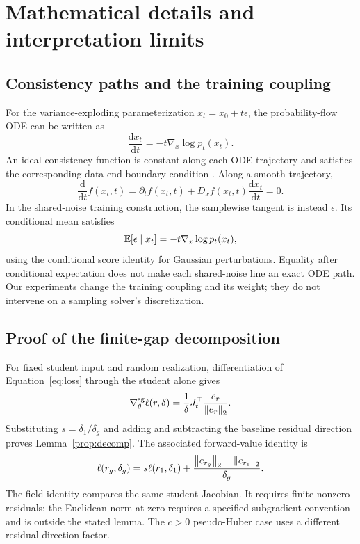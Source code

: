 \section{Mathematical details and interpretation limits}
\label{app:theory}
\subsection{Consistency paths and the training coupling}
For the variance-exploding parameterization $x_t=x_0+t\epsilon$, the probability-flow ODE can be written as
\begin{equation}
 \frac{\mathrm dx_t}{\mathrm dt}=-t\nabla_x\log p_t(x_t).
\end{equation}
An ideal consistency function is constant along each ODE trajectory and satisfies the corresponding data-end boundary condition \citep{song2021sde,song2023consistency}. Along a smooth trajectory,
\begin{equation}
 \frac{\mathrm d}{\mathrm dt}f(x_t,t)
 =\partial_t f(x_t,t)+D_x f(x_t,t)\frac{\mathrm dx_t}{\mathrm dt}=0.
\end{equation}
In the shared-noise training construction, the samplewise tangent is instead $\epsilon$. Its conditional mean satisfies
\begin{equation}
 \mathbb{E}[\epsilon\mid x_t]=-t\nabla_x\log p_t(x_t),
\end{equation}
using the conditional score identity for Gaussian perturbations. Equality after conditional expectation does not make each shared-noise line an exact ODE path. Our experiments change the training coupling and its weight; they do not intervene on a sampling solver's discretization.

\subsection{Proof of the finite-gap decomposition}
For fixed student input and random realization, differentiation of Equation~\ref{eq:loss} through the student alone gives
\begin{equation}
 \nabla_\theta^{\rm sg}\ell(r,\delta)
 =\frac{1}{\delta}J_t^\top\frac{e_r}{\left\lVert e_r\right\rVert_2}.
\end{equation}
Substituting $s=\delta_1/\delta_g$ and adding and subtracting the baseline residual direction proves Lemma~\ref{prop:decomp}. The associated forward-value identity is
\begin{equation}
 \ell(r_g,\delta_g)=s\ell(r_1,\delta_1)
 +\frac{\left\lVert e_{r_g}\right\rVert_2-\left\lVert e_{r_1}\right\rVert_2}{\delta_g}.
\end{equation}
The field identity compares the same student Jacobian. It requires finite nonzero residuals; the Euclidean norm at zero requires a specified subgradient convention and is outside the stated lemma. The $c>0$ pseudo-Huber case uses a different residual-direction factor.

